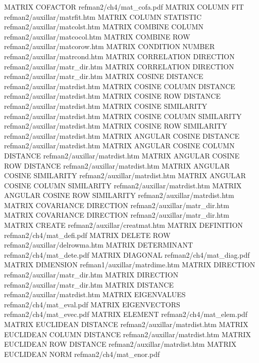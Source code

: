 MATRIX COFACTOR                         refman2/ch4/mat_cofa.pdf
MATRIX COLUMN FIT                       refman2/auxillar/matrfit.htm
MATRIX COLUMN STATISTIC                 refman2/auxillar/matcolst.htm
MATRIX COMBINE COLUMN                   refman2/auxillar/matcocol.htm
MATRIX COMBINE ROW                      refman2/auxillar/matcorow.htm
MATRIX CONDITION NUMBER                 refman2/auxillar/matrcond.htm
MATRIX CORRELATION DIRECTION            refman2/auxillar/matr_dir.htm
MATRIX CORRELATION DIRECTION            refman2/auxillar/matr_dir.htm
MATRIX COSINE DISTANCE                  refman2/auxillar/matrdist.htm
MATRIX COSINE COLUMN DISTANCE           refman2/auxillar/matrdist.htm
MATRIX COSINE ROW DISTANCE              refman2/auxillar/matrdist.htm
MATRIX COSINE SIMILARITY                refman2/auxillar/matrdist.htm
MATRIX COSINE COLUMN SIMILARITY         refman2/auxillar/matrdist.htm
MATRIX COSINE ROW SIMILARITY            refman2/auxillar/matrdist.htm
MATRIX ANGULAR COSINE DISTANCE          refman2/auxillar/matrdist.htm
MATRIX ANGULAR COSINE COLUMN DISTANCE   refman2/auxillar/matrdist.htm
MATRIX ANGULAR COSINE ROW DISTANCE      refman2/auxillar/matrdist.htm
MATRIX ANGULAR COSINE SIMILARITY        refman2/auxillar/matrdist.htm
MATRIX ANGULAR COSINE COLUMN SIMILARITY refman2/auxillar/matrdist.htm
MATRIX ANGULAR COSINE ROW SIMILARITY    refman2/auxillar/matrdist.htm
MATRIX COVARIANCE DIRECTION             refman2/auxillar/matr_dir.htm
MATRIX COVARIANCE DIRECTION             refman2/auxillar/matr_dir.htm
MATRIX CREATE                           refman2/auxillar/creatmat.htm
MATRIX DEFINITION                       refman2/ch4/mat_defi.pdf
MATRIX DELETE ROW                       refman2/auxillar/delrowma.htm
MATRIX DETERMINANT                      refman2/ch4/mat_dete.pdf
MATRIX DIAGONAL                         refman2/ch4/mat_diag.pdf
MATRIX DIMENSION                        refman1/auxillar/matrdime.htm
MATRIX DIRECTION                        refman2/auxillar/matr_dir.htm
MATRIX DIRECTION                        refman2/auxillar/matr_dir.htm
MATRIX DISTANCE                         refman2/auxillar/matrdist.htm
MATRIX EIGENVALUES                      refman2/ch4/mat_eval.pdf
MATRIX EIGENVECTORS                     refman2/ch4/mat_evec.pdf
MATRIX ELEMENT                          refman2/ch4/mat_elem.pdf
MATRIX EUCLIDEAN DISTANCE               refman2/auxillar/matrdist.htm
MATRIX EUCLIDEAN COLUMN DISTANCE        refman2/auxillar/matrdist.htm
MATRIX EUCLIDEAN ROW DISTANCE           refman2/auxillar/matrdist.htm
MATRIX EUCLIDEAN NORM                   refman2/ch4/mat_enor.pdf

